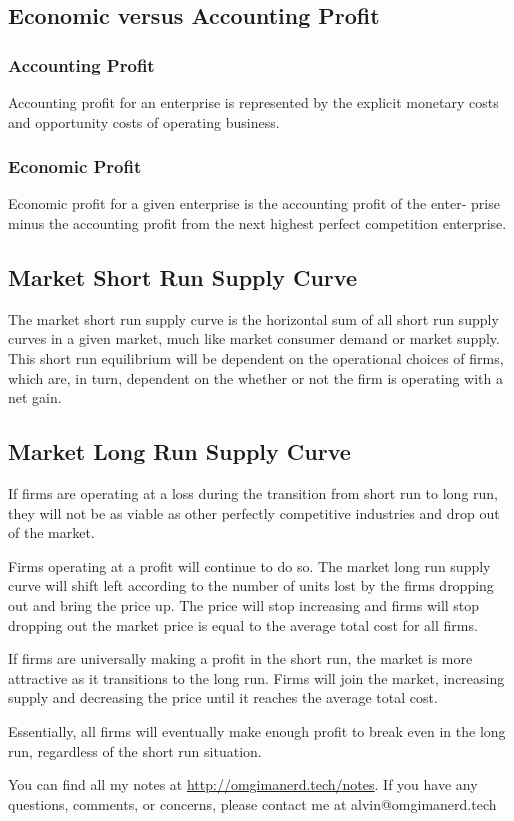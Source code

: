 \documentclass[letterpaper, 12pt]{article}
\begin{document}
\subsection{Economic versus Accounting Profit}

\subsubsection{Accounting Profit}
Accounting profit for an enterprise is represented by the explicit monetary
costs and opportunity costs of operating business.

\subsubsection{Economic Profit}
Economic profit for a given enterprise is the accounting profit of the enter-
prise minus the accounting profit from the next highest perfect competition
enterprise.

\subsection{Market Short Run Supply Curve}
The market short run supply curve is the horizontal sum of all short
run supply curves in a given market, much like market consumer demand
or market supply. This short run equilibrium will be dependent on the
operational choices of firms, which are, in turn, dependent on the whether or
not the firm is operating with a net gain.

\subsection{Market Long Run Supply Curve}
If firms are operating at a loss during the transition from short run to long
run, they will not be as viable as other perfectly competitive industries and
drop out of the market. \par
Firms operating at a profit will continue to do so.
The market long run supply curve will shift left according to the number of
units lost by the firms dropping out and bring the price up. The price will
stop increasing and firms will stop dropping out the market price is equal to
the average total cost for all firms. \par
If firms are universally making a profit in the short run, the market is more
attractive as it transitions to the long run. Firms will join the market,
increasing supply and decreasing the price until it reaches the average total
cost. \par
Essentially, all firms will eventually make enough profit to break even in the
long run, regardless of the short run situation.

\begin{center}
  You can find all my notes at \url{http://omgimanerd.tech/notes}. If you have
  any questions, comments, or concerns, please contact me at
  alvin@omgimanerd.tech
\end{center}
\end{document}
